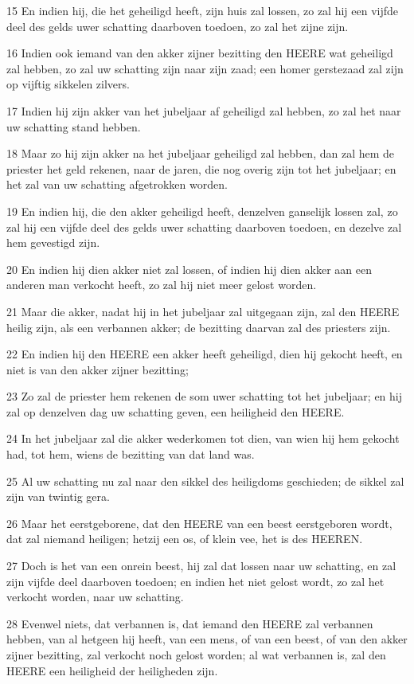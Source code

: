 \par 15 En indien hij, die het geheiligd heeft, zijn huis zal lossen, zo zal hij een vijfde deel des gelds uwer schatting daarboven toedoen, zo zal het zijne zijn.
\par 16 Indien ook iemand van den akker zijner bezitting den HEERE wat geheiligd zal hebben, zo zal uw schatting zijn naar zijn zaad; een homer gerstezaad zal zijn op vijftig sikkelen zilvers.
\par 17 Indien hij zijn akker van het jubeljaar af geheiligd zal hebben, zo zal het naar uw schatting stand hebben.
\par 18 Maar zo hij zijn akker na het jubeljaar geheiligd zal hebben, dan zal hem de priester het geld rekenen, naar de jaren, die nog overig zijn tot het jubeljaar; en het zal van uw schatting afgetrokken worden.
\par 19 En indien hij, die den akker geheiligd heeft, denzelven ganselijk lossen zal, zo zal hij een vijfde deel des gelds uwer schatting daarboven toedoen, en dezelve zal hem gevestigd zijn.
\par 20 En indien hij dien akker niet zal lossen, of indien hij dien akker aan een anderen man verkocht heeft, zo zal hij niet meer gelost worden.
\par 21 Maar die akker, nadat hij in het jubeljaar zal uitgegaan zijn, zal den HEERE heilig zijn, als een verbannen akker; de bezitting daarvan zal des priesters zijn.
\par 22 En indien hij den HEERE een akker heeft geheiligd, dien hij gekocht heeft, en niet is van den akker zijner bezitting;
\par 23 Zo zal de priester hem rekenen de som uwer schatting tot het jubeljaar; en hij zal op denzelven dag uw schatting geven, een heiligheid den HEERE.
\par 24 In het jubeljaar zal die akker wederkomen tot dien, van wien hij hem gekocht had, tot hem, wiens de bezitting van dat land was.
\par 25 Al uw schatting nu zal naar den sikkel des heiligdoms geschieden; de sikkel zal zijn van twintig gera.
\par 26 Maar het eerstgeborene, dat den HEERE van een beest eerstgeboren wordt, dat zal niemand heiligen; hetzij een os, of klein vee, het is des HEEREN.
\par 27 Doch is het van een onrein beest, hij zal dat lossen naar uw schatting, en zal zijn vijfde deel daarboven toedoen; en indien het niet gelost wordt, zo zal het verkocht worden, naar uw schatting.
\par 28 Evenwel niets, dat verbannen is, dat iemand den HEERE zal verbannen hebben, van al hetgeen hij heeft, van een mens, of van een beest, of van den akker zijner bezitting, zal verkocht noch gelost worden; al wat verbannen is, zal den HEERE een heiligheid der heiligheden zijn.
